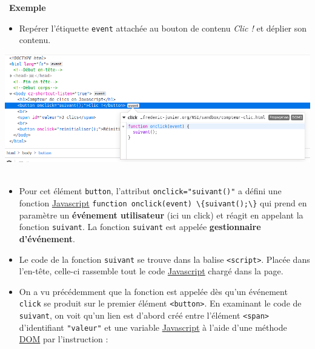 \documentclass[
  11pt,
]{article}
\newcommand{\passthrough}[1]{#1}
\providecommand{\tightlist}{%
  \setlength{\itemsep}{0pt}\setlength{\parskip}{0pt}}
\newcounter{exo}
\newcounter{exple}
\newenvironment{exemple}[1]
{\par \medskip   \addtocounter{exple}{1} \noindent  
\begin{bclogo}[arrondi =0.1,   noborder = true, logo=\bclampe, marge=4]{~\textbf{Exemple} \textbf{\theexple} {\itshape #1} }  \par}
{
\end{bclogo}
 \par \bigskip }
\begin{document}
\begin{exemple}{}
\begin{enumerate}
  \begin{itemize}
  \tightlist
  \item
    Repérer l'étiquette \passthrough{\lstinline!event!} attachée au
    bouton de contenu \emph{Clic !} et déplier son contenu.
  \end{itemize}

  \includegraphics{images/exo3-fig1.png}~

  \begin{itemize}
  \tightlist
  \item
    Pour cet élément \passthrough{\lstinline!button!}, l'attribut
    \passthrough{\lstinline!onclick="suivant()"!} a défini une fonction
    \href{https://developer.mozilla.org/fr/docs/Glossaire/JavaScript}{Javascript}
    \passthrough{\lstinline!function onclick(event) \{suivant();\}!} qui
    prend en paramètre un \textbf{événement utilisateur} (ici un click)
    et réagit en appelant la fonction \passthrough{\lstinline!suivant!}.
    La fonction \passthrough{\lstinline!suivant!} est appelée
    \textbf{gestionnaire d'événement}.
  \item
    Le code de la fonction \passthrough{\lstinline!suivant!} se trouve
    dans la balise \passthrough{\lstinline!<script>!}. Placée dans
    l'en-tête, celle-ci rassemble tout le code
    \href{https://developer.mozilla.org/fr/docs/Glossaire/JavaScript}{Javascript}
    chargé dans la page.
  \item
    On a vu précédemment que la fonction est appelée dès qu'un événement
    \passthrough{\lstinline!click!} se produit sur le premier élément
    \passthrough{\lstinline!<button>!}. En examinant le code de
    \passthrough{\lstinline!suivant!}, on voit qu'un lien est d'abord
    créé entre l'élément \passthrough{\lstinline!<span>!} d'identifiant
    \passthrough{\lstinline!"valeur"!} et une variable
    \href{https://developer.mozilla.org/fr/docs/Glossaire/JavaScript}{Javascript}
    à l'aide d'une méthode
    \href{https://developer.mozilla.org/fr/docs/Glossaire/DOM}{DOM} par
    l'instruction :
  \end{itemize}


\end{enumerate}
\end{exemple}
\end{document}
